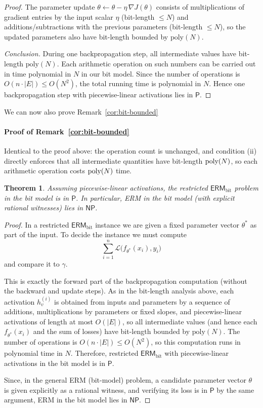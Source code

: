 \documentclass{article}
\newcommand{\cL}{\mathcal{L}}
\newcommand{\poly}{\textnormal{poly}}
\theoremstyle{plain}
\newtheorem{theorem}{Theorem}[section]
\theoremstyle{definition}
\theoremstyle{remark}
\begin{document}
\begin{proof}
	The parameter update
	$\theta \leftarrow \theta - \eta\,\nabla J(\theta)$ consists of multiplications
	of gradient entries by the input scalar $\eta$ (bit-length $\le N$) and
	additions/subtractions with the previous parameters (bit-length $\le N$),
	so the updated parameters also have bit-length bounded by $\mathrm{poly}(N)$.
	
	\emph{Conclusion.}
	During one backpropagation step, all intermediate values have bit-length
	$\mathrm{poly}(N)$. Each arithmetic operation on such numbers can be carried
	out in time polynomial in $N$ in our bit model. Since the number of operations
	is $O(n\cdot|E|)\le O(N^2)$, the total running time is polynomial in $N$.
	Hence one backpropagation step with piecewise-linear activations lies in
	$\mathsf{P}$.
\end{proof}


We can now also prove Remark~\ref{cor:bit-bounded}
\paragraph{Proof of Remark~\ref{cor:bit-bounded}}
Identical to the proof above: the operation count is unchanged, and condition (ii) directly enforces that all
intermediate quantities have bit-length $\poly(N)$, so each arithmetic operation costs $\poly(N)$ time.


\begin{theorem}
	Assuming piecewise-linear activations,
	the \textnormal{restricted $\mathsf{ERM}_{\text{bit}}$} problem in the bit model is in $\mathsf{P}$. In particular,
	\textnormal{ERM} in the bit model (with explicit rational witnesses) lies in
	$\mathsf{NP}$.
\end{theorem}

\begin{proof}
	In a restricted $\mathsf{ERM}_{\text{bit}}$ instance we are given a fixed parameter vector
	$\theta^\ast$ as part of the input. To decide the instance we must compute
	\[
	\sum_{i=1}^n \cL\bigl(f_{\theta^\ast}(x_i),y_i\bigr)
	\]
	and compare it to $\gamma$.
	
	This is exactly the forward part of the backpropagation computation (without
	the backward and update steps). As in the bit-length analysis above, each
	activation $h_v^{(i)}$ is obtained from inputs and parameters by a sequence of
	additions, multiplications by parameters or fixed slopes, and
	piecewise-linear activations of length at most $O(|E|)$, so all intermediate
	values (and hence each $f_{\theta^\ast}(x_i)$ and the sum of losses) have
	bit-length bounded by $\mathrm{poly}(N)$. The number of operations is
	$O(n\cdot|E|)\le O(N^2)$, so this computation runs in polynomial time in $N$.
	Therefore, restricted $\mathsf{ERM}_{\text{bit}}$ with piecewise-linear activations in the bit model is in $\mathsf{P}$.
	
	Since, in the general ERM (bit-model) problem, a candidate parameter vector
	$\theta$ is given explicitly as a rational witness, and verifying its loss is
	in $\mathsf{P}$ by the same argument, ERM in the bit model lies in
	$\mathsf{NP}$.
\end{proof}
\end{document}
